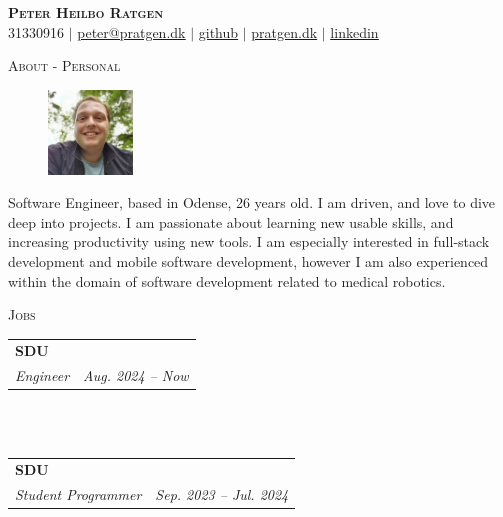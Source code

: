 \documentclass[11pt]{article}
\makeatletter
\newcommand{\resumeSubheading}[4]{
  \noindent\begin{tabular*}{0.98\textwidth}[t]{l@{\extracolsep{\fill}}r}
    \noindent \textbf{#1} & #2 \\ \vspace{-3pt} 
    \noindent \textit{\small#3} & \textit{\small #4} 
  \end{tabular*}\vspace{7pt}
}
\makeatother
\begin{document}
\begin{center}
  \textbf{\huge{\scshape{Peter Heilbo Ratgen}}}\\ 
  \vspace{0.2cm}
  \small 31330916 $|$
  \href{mailto:peter@pratgen.dk}{\underline{peter@pratgen.dk}} $|$
  \href{https://github.com/ratgen }{\underline{github}} $|$
  \href{https://pratgen.dk}{\underline{pratgen.dk}} $|$
  \href{https://www.linkedin.com/in/peter-ratgen-a1236529/}{\underline{linkedin}}
\end{center}

\noindent\large{\scshape{About - Personal}} \newline
\noindent{\rule[0.3cm]{\textwidth}{0.4pt}}

\begin{figure}
  \vspace{-0.7cm}
  \includegraphics[width=0.2\textwidth, right]{./profile.jpg}
\end{figure}
\normalsize Software Engineer, based in Odense, 26 years
old. I am driven, and love to dive deep into projects. I am passionate about
learning new usable skills, and increasing productivity using new tools. I am
especially interested in full-stack development and mobile software development,
however I am also experienced within the  domain of software development related
to medical robotics. 

\vspace{0.3cm}

\noindent\large{\scshape{Jobs}} \newline
\noindent{\rule[0.3cm]{\textwidth}{0.4pt}}

\resumeSubheading{SDU}{}{Engineer}{Aug. 2024 -- Now}\\
 \\

\resumeSubheading{SDU}{}{Student Programmer}{Sep. 2023 -- Jul. 2024}\\
 \\
\end{document}
